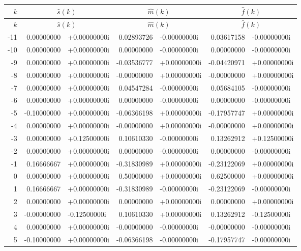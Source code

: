 \begin{longtable}{r r@{\,}l r@{\,}l r@{\,}l}
\toprule
$k$ & \multicolumn{2}{c}{$\widehat s(k)$} & \multicolumn{2}{c}{$\widehat m(k)$} & \multicolumn{2}{c}{$\widehat f(k)$}\\
\midrule
\endfirsthead
\toprule
$k$ & \multicolumn{2}{c}{$\widehat s(k)$} & \multicolumn{2}{c}{$\widehat m(k)$} & \multicolumn{2}{c}{$\widehat f(k)$}\\
\midrule
\endhead
-11 & 0.00000000 & +0.00000000i & 0.02893726 & -0.00000000i & 0.03617158 & -0.00000000i\\
-10 & 0.00000000 & +0.00000000i & 0.00000000 & -0.00000000i & 0.00000000 & -0.00000000i\\
-9 & 0.00000000 & +0.00000000i & -0.03536777 & +0.00000000i & -0.04420971 & +0.00000000i\\
-8 & 0.00000000 & +0.00000000i & -0.00000000 & +0.00000000i & -0.00000000 & +0.00000000i\\
-7 & 0.00000000 & +0.00000000i & 0.04547284 & -0.00000000i & 0.05684105 & -0.00000000i\\
-6 & 0.00000000 & +0.00000000i & 0.00000000 & -0.00000000i & 0.00000000 & -0.00000000i\\
-5 & -0.10000000 & +0.00000000i & -0.06366198 & +0.00000000i & -0.17957747 & +0.00000000i\\
-4 & 0.00000000 & +0.00000000i & -0.00000000 & +0.00000000i & -0.00000000 & +0.00000000i\\
-3 & 0.00000000 & +0.12500000i & 0.10610330 & -0.00000000i & 0.13262912 & +0.12500000i\\
-2 & 0.00000000 & +0.00000000i & 0.00000000 & -0.00000000i & 0.00000000 & -0.00000000i\\
-1 & 0.16666667 & +0.00000000i & -0.31830989 & +0.00000000i & -0.23122069 & +0.00000000i\\
0 & 0.00000000 & +0.00000000i & 0.50000000 & +0.00000000i & 0.62500000 & +0.00000000i\\
1 & 0.16666667 & +0.00000000i & -0.31830989 & -0.00000000i & -0.23122069 & -0.00000000i\\
2 & 0.00000000 & +0.00000000i & 0.00000000 & +0.00000000i & 0.00000000 & +0.00000000i\\
3 & -0.00000000 & -0.12500000i & 0.10610330 & +0.00000000i & 0.13262912 & -0.12500000i\\
4 & 0.00000000 & +0.00000000i & -0.00000000 & -0.00000000i & -0.00000000 & -0.00000000i\\
5 & -0.10000000 & +0.00000000i & -0.06366198 & -0.00000000i & -0.17957747 & -0.00000000i\\

\end{longtable}
